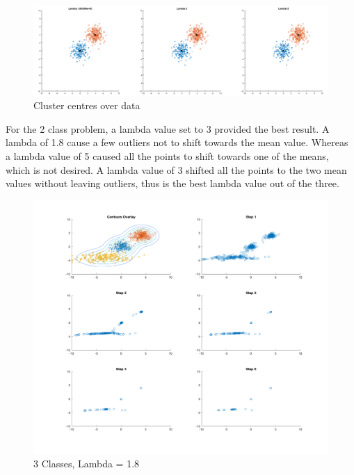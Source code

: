 \begin{figure}[H]
    \includegraphics[width=\linewidth]{../../pracs/week5/images/q3_2class_means}
    \centering
    \caption{Cluster centres over data}
\end{figure}

For the 2 class problem, a lambda value set to 3 provided the best result. A lambda of 1.8 cause a few outliers not to shift towards the mean value.
Whereas a lambda value of 5 caused all the points to shift towards one of the means, which is not desired.
A lambda value of 3 shifted all the points to the two mean values without leaving outliers, thus is the best lambda value out of the three.

\begin{figure}[H]
    \includegraphics[width=\linewidth]{../../pracs/week5/images/q3_3class_1_8}
    \centering
    \caption{3 Classes, Lambda = 1.8}
\end{figure}

